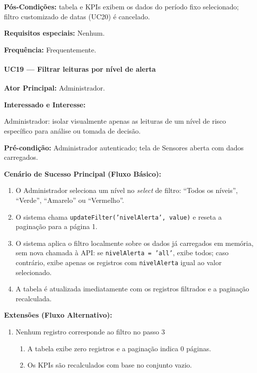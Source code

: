 \textbf{Pós-Condições:} tabela e KPIs exibem os dados
do período fixo selecionado; filtro customizado de datas
(UC20) é cancelado.

\textbf{Requisitos especiais:} Nenhum.

\textbf{Frequência:} Frequentemente.

\paragraph{UC19 --- Filtrar leituras por nível de alerta}\hfill\break

\textbf{Ator Principal:} Administrador.

\textbf{Interessado e Interesse:}

Administrador: isolar visualmente apenas as leituras de
um nível de risco específico para análise ou tomada
de decisão.

\textbf{Pré-condição:} Administrador autenticado; tela de
Sensores aberta com dados carregados.

\textbf{Cenário de Sucesso Principal (Fluxo Básico):}
\begin{enumerate}
  \item O Administrador seleciona um nível no
        \textit{select} de filtro: ``Todos os níveis'',
        ``Verde'', ``Amarelo'' ou ``Vermelho''.
  \item O sistema chama \texttt{updateFilter('nivelAlerta',
        value)} e reseta a paginação para a página 1.
  \item O sistema aplica o filtro localmente sobre os
        dados já carregados em memória, sem nova chamada
        à API: se \texttt{nivelAlerta = 'all'}, exibe
        todos; caso contrário, exibe apenas os registros
        com \texttt{nivelAlerta} igual ao valor
        selecionado.
  \item A tabela é atualizada imediatamente com os
        registros filtrados e a paginação recalculada.
\end{enumerate}

\textbf{Extensões (Fluxo Alternativo):}

\begin{enumerate}
  \renewcommand{\theenumi}{3a}
  \renewcommand{\labelenumi}{\theenumi.}
  \item Nenhum registro corresponde ao filtro no passo 3
  \begin{enumerate}
  \item A tabela exibe zero registros e a paginação
        indica 0 páginas.
  \item Os KPIs são recalculados com base no conjunto
        vazio.
  \end{enumerate}
\end{enumerate}

